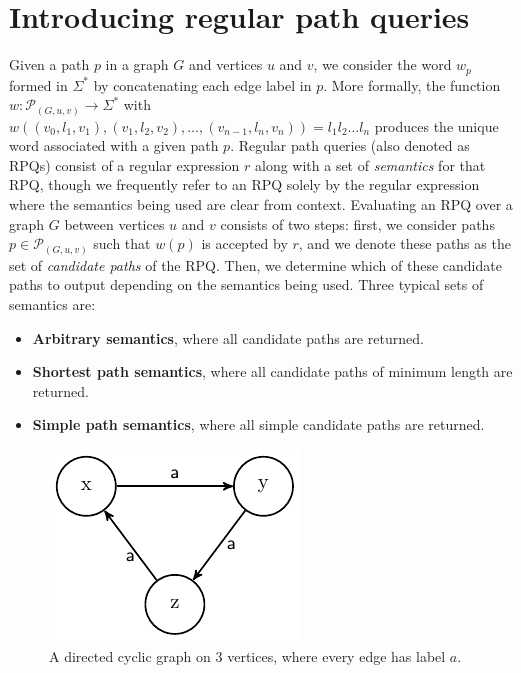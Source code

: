 \documentclass{article}
\begin{document}
\section{Introducing regular path queries}
\label{sec:intro_rpqs}

Given a path $p$ in a graph $G$ and vertices $u$ and $v$, we consider the word $w_p$ formed in $\Sigma^*$ by concatenating each edge label in $p$. More formally, the function $w: \mathcal{P}_{(G,u,v)} \rightarrow \Sigma^*$ with $w \left((v_0, l_1, v_1), (v_1, l_2, v_2), \dots, (v_{n-1}, l_n, v_n) \right) = l_1 l_2 \dots l_n$ produces the unique word associated with a given path $p$. Regular path queries (also denoted as RPQs) consist of a regular expression $r$ along with a set of \emph{semantics} for that RPQ, though we frequently refer to an RPQ solely by the regular expression where the semantics being used are clear from context. Evaluating an RPQ over a graph $G$ between vertices $u$ and $v$ consists of two steps: first, we consider paths $p \in \mathcal{P}_{(G,u,v)}$ such that $w(p)$ is accepted by $r$, and we denote these paths as the set of \emph{candidate paths} of the RPQ. Then, we determine which of these candidate paths to output depending on the semantics being used. Three typical sets of semantics are:

\begin{itemize}
    \item \textbf{Arbitrary semantics}, where all candidate paths are returned.
    \item \textbf{Shortest path semantics}, where all candidate paths of minimum length are returned.
    \item \textbf{Simple path semantics}, where all simple candidate paths are returned.
\end{itemize}

\begin{figure}
    \centering
    \label{fig:arbitrary_infinite}
    \includegraphics{figures/arbitrary_infinite.pdf}
    \caption{A directed cyclic graph on $3$ vertices, where every edge has label $a$.}
\end{figure}
\end{document}
